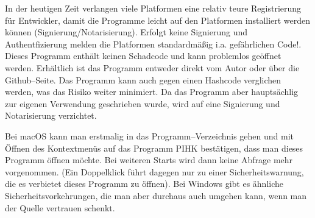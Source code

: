 \documentclass[a4paper,notitlepage,parskip=half]{scrartcl}
\begin{document}
\begin{marker}
In der heutigen Zeit verlangen viele Platformen eine relativ teure Registrierung für Entwickler, damit die Programme leicht auf den Platformen installiert werden können (Signierung/Notarisierung). Erfolgt keine Signierung und Authentfizierung melden die Platformen standardmäßig i.a. gefährlichen Code!. Dieses Programm enthält keinen Schadcode und kann problemlos geöffnet werden.
Erhältlich ist das Programm entweder direkt vom Autor oder über die Github--Seite.
Das Programm kann auch gegen einen Hashcode verglichen werden, was das Risiko weiter minimiert.
Da das Programm aber hauptsächlig zur eigenen Verwendung geschrieben wurde, wird auf eine Signierung und Notarisierung verzichtet.

Bei macOS kann man erstmalig in das Programm--Verzeichnis gehen und mit Öffnen des Kontextmenüs auf das Programm PIHK bestätigen, dass man dieses Programm öffnen möchte.
Bei weiteren Starts wird dann keine Abfrage mehr vorgenommen. (Ein Doppelklick führt dagegen nur zu einer Sicherheitswarnung, die es verbietet dieses Programm zu öffnen).
Bei Windows gibt es ähnliche Sicherheitsvorkehrungen, die man aber durchaus auch umgehen kann, wenn man der Quelle vertrauen schenkt.
\end{marker}
\end{document}
